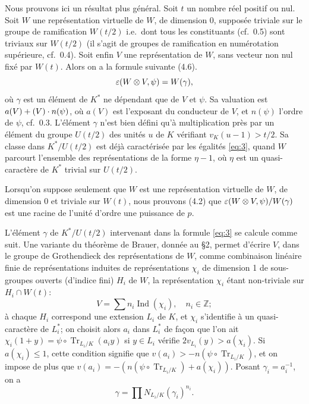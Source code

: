 \documentclass[12pt,a4paper]{article}
\theoremstyle{plain}
\theoremstyle{definition}
\theoremstyle{remark}
\DeclareMathOperator{\Ind}{Ind}
\DeclareMathOperator{\Tr}{Tr}
\let\dim\relax\let\det\relax
\providecommand{\Tr}{\operatorname{Tr}}
\begin{document}
Nous prouvons ici un r\'esultat plus g\'en\'eral. Soit $t$ un nombre r\'eel positif ou nul. Soit $W$ une repr\'esentation virtuelle de $W$, de dimension 0, suppos\'ee triviale sur le groupe de ramification $W(t/2)$ i.e.~dont tous les constituants (cf.~0.5) sont triviaux sur $W(t/2)$ (il s'agit de groupes de ramification en num\'erotation sup\'erieure, cf.~0.4). Soit enfin $V$ une repr\'esentation de $W$, sans vecteur non nul fix\'e par $W(t)$. Alors on a la formule suivante (4.6).
\begin{equation}\label{eq:3}
\varepsilon(W \otimes V, \psi) = \det W(\gamma),
\end{equation}
o\`u $\gamma$ est un \'el\'ement de $K^*$ ne d\'ependant que de $V$ et $\psi$. Sa valuation est $a(V) + (\dim V) \cdot n(\psi)$, o\`u $a(V)$ est l'exposant du conducteur de $V$, et $n(\psi)$ l'ordre de $\psi$, cf.~0.3. L'\'el\'ement $\gamma$ n'est bien d\'efini qu'\`a multiplication pr\`es par un \'el\'ement du groupe $U(t/2)$ des unit\'es $u$ de $K$ v\'erifiant $v_K(u-1) > t/2$. Sa classe dans $K^*/U(t/2)$ est d\'ej\`a caract\'eris\'ee par les \'egalit\'es \eqref{eq:3}, quand $W$ parcourt l'ensemble des repr\'esentations de la forme $\eta - 1$, o\`u $\eta$ est un quasi-caract\`ere de $K^*$ trivial sur $U(t/2)$.

Lorsqu'on suppose seulement que $W$ est une repr\'esentation virtuelle de $W$, de dimension 0 et triviale sur $W(t)$, nous prouvons (4.2) que $\varepsilon(W \otimes V, \psi)/\det W(\gamma)$ est une racine de l'unit\'e d'ordre une puissance de $p$.

L'\'el\'ement $\gamma$ de $K^*/U(t/2)$ intervenant dans la formule \eqref{eq:3} se calcule comme suit. Une variante du th\'eor\`eme de Brauer, donn\'ee au \S 2, permet d'\'ecrire $V$, dans le groupe de Grothendieck des repr\'esentations de $W$, comme combinaison lin\'eaire finie de repr\'esentations induites de repr\'esentations $\chi_i$ de dimension 1 de sous-groupes ouverts (d'indice fini) $H_i$ de $W$, la repr\'esentation $\chi_i$ \'etant non-triviale sur $H_i \cap W(t)$:
\[
V = \sum n_i \Ind(\chi_i), \quad n_i \in \mathbb{Z};
\]
\`a chaque $H_i$ correspond une extension $L_i$ de $K$, et $\chi_i$ s'identifie \`a un quasi-caract\`ere de $L_i^*$; on choisit alors $a_i$ dans $L_i^*$ de fa\c{c}on que l'on ait $\chi_i(1+y) = \psi \circ \Tr_{L_i/K}(a_i y)$ si $y \in L_i$ v\'erifie $2v_{L_i}(y) > a(\chi_i)$. Si $a(\chi_i) \leq 1$, cette condition signifie que $v(a_i) > -n(\psi \circ \Tr_{L_i/K})$, et on impose de plus que $v(a_i) = -(n(\psi \circ \Tr_{L_i/K}) + a(\chi_i))$. Posant $\gamma_i = a_i^{-1}$, on a
\begin{equation}\label{eq:4}
\gamma = \prod N_{L_i/K}(\gamma_i)^{n_i}.
\end{equation}
\end{document}
